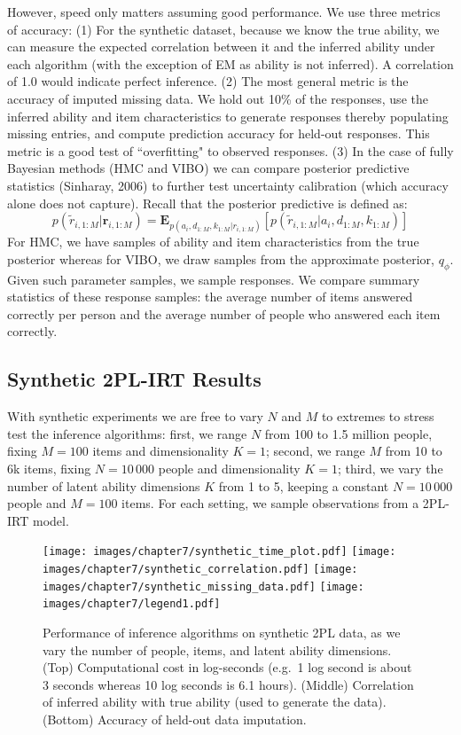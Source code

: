 However, speed only matters assuming good performance.
We use three metrics of accuracy:
(1) For the synthetic dataset, because we know the true ability, we can measure the expected correlation between it and the inferred ability under each algorithm (with the exception of EM as ability is not inferred).
A correlation of 1.0 would indicate perfect inference.
(2) The most general metric is the accuracy of imputed missing data.
We hold out 10\% of the responses, use the inferred ability and item characteristics to generate responses thereby populating missing entries, and compute prediction accuracy for held-out responses.
This metric is a good test of ``overfitting" to observed responses.
(3) In the case of fully Bayesian methods (HMC and VIBO) we can compare posterior predictive statistics (Sinharay, 2006) to further test uncertainty calibration (which accuracy alone does not capture).
Recall that the posterior predictive is defined as:
\begin{equation}
    p(\tilde{r}_{i, 1:M}|\textbf{r}_{i,1:M}) = \mathbf{E}_{p({a}_i,{d}_{1:M},k_{1:M}|{r}_{i,1:M})}[p(\tilde{r}_{i,1:M}|{a}_i,{d}_{1:M}, k_{1:M})]
\end{equation}
For HMC, we have samples of ability and item characteristics from the true posterior whereas for VIBO, we draw samples from the approximate posterior, $q_\phi$.
Given such parameter samples, we sample responses.
We compare summary statistics of these response samples: the average number of items answered correctly per person and the average number of people who answered each item correctly.

\subsection{Synthetic 2PL-IRT Results}

With synthetic experiments we are free to vary $N$ and $M$ to extremes to stress test the inference algorithms: first, we range $N$ from 100 to 1.5 million people, fixing $M=100$ items and dimensionality $K=1$; second, we range $M$ from 10 to 6k items, fixing $N= 10\,000$ people and dimensionality $K=1$; third,
we vary the number of latent ability dimensions $K$ from 1 to 5, keeping a constant $N=10\,000$ people and $M=100$ items. For each setting, we sample observations from a 2PL-IRT model.

\begin{figure}
    \centering
    \texttt{[image: images/chapter7/synthetic\_time\_plot.pdf]}
    \texttt{[image: images/chapter7/synthetic\_correlation.pdf]}
    \texttt{[image: images/chapter7/synthetic\_missing\_data.pdf]}
    \texttt{[image: images/chapter7/legend1.pdf]}
    \caption{Performance of inference algorithms on synthetic 2PL data, as we vary the number of people, items, and latent ability dimensions. (Top) Computational cost in log-seconds (e.g.~1 log second is about 3 seconds whereas 10 log seconds is 6.1 hours). (Middle) Correlation of inferred ability with true ability (used to generate the data). (Bottom) Accuracy of held-out data imputation.}
    \label{fig:synth_results}
\end{figure}

